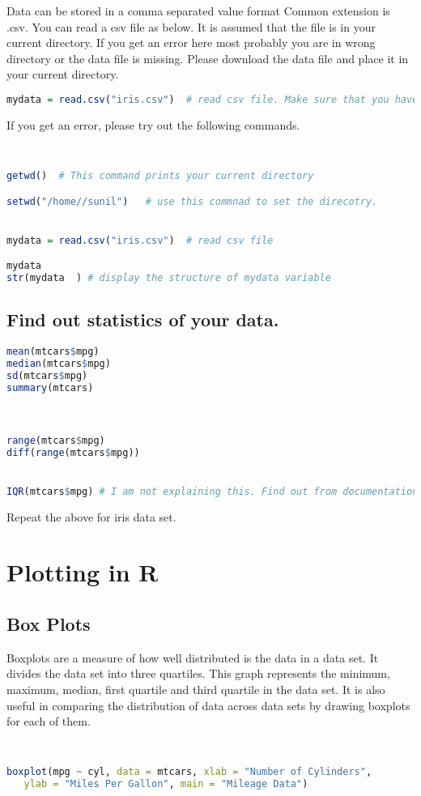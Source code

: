 \documentclass["../Applied_probabillity _and_statistics_lab_KTU.tex"]{subfiles}
\begin{document}
Data can be stored in a comma separated value format Common extension is .csv. You can read a csv file as below. It is assumed that the file is in your current directory. If you get an error here most probably you are in wrong directory or the data file is missing. Please download the data file and place it in your current directory. 

\begin{lstlisting}[language=R]
 mydata = read.csv("iris.csv")  # read csv file. Make sure that you have the csv file
\end{lstlisting}
 If you get an error, please try out the following commands. 
 \begin{lstlisting}[language=R]
 

getwd()  # This command prints your current directory

setwd("/home//sunil")   # use this commnad to set the direcotry.


mydata = read.csv("iris.csv")  # read csv file

mydata
str(mydata  ) # display the structure of mydata variable

\end{lstlisting}
 
\subsection{
Find out statistics of your data.}

\begin{lstlisting}[language=R]
 mean(mtcars$mpg)
median(mtcars$mpg)
sd(mtcars$mpg)
summary(mtcars)



range(mtcars$mpg)
diff(range(mtcars$mpg))


IQR(mtcars$mpg) # I am not explaining this. Find out from documentation.:D
\end{lstlisting}

Repeat the above for iris data set.

 \section{Plotting in R}
\subsection{Box Plots}
Boxplots are a measure of how well distributed is the data in a data set. It divides the data set into three quartiles. This graph represents the minimum, maximum, median, first quartile and third quartile in the data set. It is also useful in comparing the distribution of data across data sets by drawing boxplots for each of them. 
\begin{lstlisting}[language=R]
 

boxplot(mpg ~ cyl, data = mtcars, xlab = "Number of Cylinders",
   ylab = "Miles Per Gallon", main = "Mileage Data")


\end{lstlisting}
\end{document}
